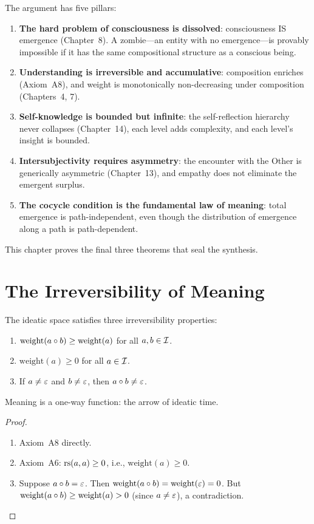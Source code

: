 The argument has five pillars:
\begin{enumerate}
\item \textbf{The hard problem of consciousness is dissolved}: consciousness
  IS emergence (Chapter~8).  A zombie---an entity with no emergence---is
  provably impossible if it has the same compositional structure as a
  conscious being.
\item \textbf{Understanding is irreversible and accumulative}: composition
  enriches (Axiom~A8), and weight is monotonically non-decreasing under
  composition (Chapters~4, 7).
\item \textbf{Self-knowledge is bounded but infinite}: the self-reflection
  hierarchy never collapses (Chapter~14), each level adds complexity, and
  each level's insight is bounded.
\item \textbf{Intersubjectivity requires asymmetry}: the encounter with
  the Other is generically asymmetric (Chapter~13), and empathy does not
  eliminate the emergent surplus.
\item \textbf{The cocycle condition is the fundamental law of meaning}:
  total emergence is path-independent, even though the distribution of
  emergence along a path is path-dependent.
\end{enumerate}

This chapter proves the final three theorems that seal the synthesis.

\section{The Irreversibility of Meaning}

\begin{theorem}
\label{thm:irreversibility}
The ideatic space satisfies three irreversibility properties:
\begin{enumerate}
\item $\mathrm{weight}(a \circ b) \geq \mathrm{weight}(a)$ for all
  $a, b \in \mathcal{I}$.
\item $\mathrm{weight}(a) \geq 0$ for all $a \in \mathcal{I}$.
\item If $a \neq \varepsilon$ and $b \neq \varepsilon$, then $a \circ b \neq \varepsilon$.
\end{enumerate}
Meaning is a one-way function: the arrow of ideatic time.
\end{theorem}

\begin{proof}
\begin{enumerate}
\item Axiom~A8 directly.
\item Axiom~A6: $\mathrm{rs}(a, a) \geq 0$, i.e., $\mathrm{weight}(a) \geq 0$.
\item Suppose $a \circ b = \varepsilon$.  Then $\mathrm{weight}(a \circ b)
  = \mathrm{weight}(\varepsilon) = 0$.  But $\mathrm{weight}(a \circ b) \geq
  \mathrm{weight}(a) > 0$ (since $a \neq \varepsilon$), a contradiction.
\end{enumerate}
\end{proof}

